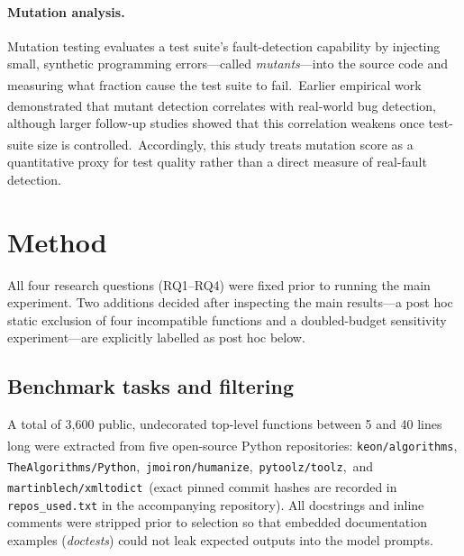 \documentclass[11pt,a4paper]{article}
\newcommand{\ysjcite}[1]{\,\textsuperscript{\cite{#1}}}
\begin{document}
\paragraph{Mutation analysis.}
Mutation testing evaluates a test suite's fault-detection capability by injecting small, synthetic programming errors---called \emph{mutants}---into the source code and measuring what fraction cause the test suite to fail.\ysjcite{jia2011mutation} Earlier empirical work demonstrated that mutant detection correlates with real-world bug detection,\ysjcite{just2014mutants} although larger follow-up studies showed that this correlation weakens once test-suite size is controlled.\ysjcite{papadakis2018correlated} Accordingly, this study treats mutation score as a quantitative proxy for test quality rather than a direct measure of real-fault detection.

\section{Method}
All four research questions (RQ1--RQ4) were fixed prior to running the main experiment. Two additions decided after inspecting the main results---a post hoc static exclusion of four incompatible functions and a doubled-budget sensitivity experiment---are explicitly labelled as post hoc below.

\subsection{Benchmark tasks and filtering}\label{sec:tasks}
A total of 3{,}600 public, undecorated top-level functions between 5 and 40 lines long were extracted from five open-source Python repositories: \texttt{keon/algorithms},\ysjcite{keon_algorithms} \texttt{TheAlgorithms/Python},\ysjcite{thealgorithms_python} \texttt{jmoiron/humanize},\ysjcite{moiron_humanize} \texttt{pytoolz/toolz},\ysjcite{rocklin_toolz} and \texttt{martinblech/xmltodict}\ysjcite{blech_xmltodict} (exact pinned commit hashes are recorded in \texttt{repos\_used.txt} in the accompanying repository). All docstrings and inline comments were stripped prior to selection so that embedded documentation examples (\emph{doctests}) could not leak expected outputs into the model prompts.
\end{document}
